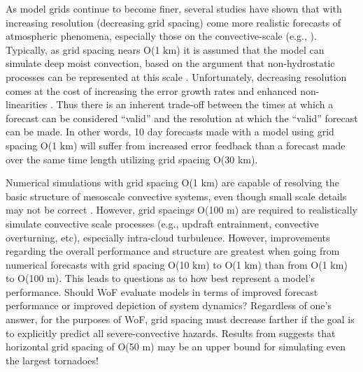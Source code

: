 As model grids continue to become finer, several studies have shown that with increasing resolution (decreasing grid spacing) come more realistic forecasts of atmospheric phenomena, especially those on the convective-scale (e.g., \citealp{clark2012overview, clark2010mcv, clark2010verification, clark2009comparison, kain2008camconsiderations, done2004cams}). Typically, as grid spacing nears O(1 km) it is assumed that the model can simulate deep moist convection, based on the argument that non-hydrostatic processes can be represented at this scale \citep{weisman1997resolution}. Unfortunately, decreasing resolution comes at the cost of increasing the error growth rates and enhanced non-linearities \citep{ancell2006structure, park1999nonlinearity, park2000sensitivity, sun2005challenges}. Thus there is an inherent trade-off between the times at which a forecast can be considered ``valid'' and  the resolution at which the ``valid'' forecast can be made. In other words, 10 day forecasts made with a model using grid spacing O(1 km) will suffer from increased error feedback than a forecast made over the same time length utilizing grid spacing O(30 km).


Numerical simulations with grid spacing O(1 km) are capable of resolving the basic structure of mesoscale convective systems, even though small scale details may not be correct \cite{bryan2003resolution}. However, grid spacings O(100 m) are required to realistically simulate convective scale processes (e.g., updraft entrainment, convective overturning, etc), especially intra-cloud turbulence. However, improvements regarding the overall performance and structure are greatest when going from numerical forecasts with grid spacing O(10 km) to O(1 km) than from O(1 km) to O(100 m)\cite{bryan2003resolution, kain2008camconsiderations}. This leads to questions as to how best represent a model's performance. Should WoF evaluate models in terms of improved forecast performance or improved depiction of system dynamics? Regardless of one's answer, for the purposes of WoF, grid spacing must decrease farther if the goal is to explicitly predict all severe-convective hazards.  Results from \cite{xue2008tornado} suggests that horizontal grid spacing of O(50 m) may be an upper bound for simulating even the largest tornadoes!


